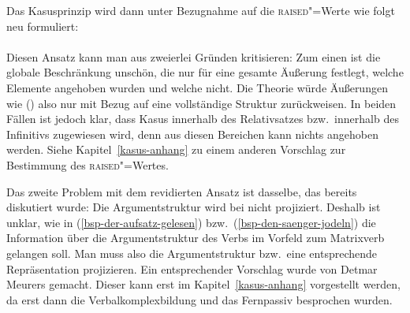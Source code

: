 Das Kasusprinzip wird dann unter Bezugnahme auf die \textsc{raised}"=Werte wie folgt neu formuliert:
\eal
\label{case-prz-zwei}
\ex {} \impl \\
    \mbox{}\hfill{}
\ex {} \impl \\
    \mbox{}\hfill{}
\zl
Diesen Ansatz kann man aus zweierlei Gründen kritisieren: Zum einen ist die globale Beschränkung
unschön, die nur für eine gesamte Äußerung festlegt, welche Elemente angehoben wurden und welche nicht.
Die Theorie würde Äußerungen wie () also nur mit Bezug auf eine vollständige Struktur zurückweisen.
\eal
{}
\zl
In beiden Fällen ist jedoch klar, dass Kasus innerhalb des Relativsatzes bzw.\
innerhalb des Infinitivs zugewiesen wird, denn aus diesen Bereichen kann nichts angehoben werden. 
Siehe Kapitel~\ref{kasus-anhang} zu einem anderen Vorschlag zur Bestimmung des \textsc{raised}"=Wertes.

Das zweite Problem mit dem revidierten Ansatz ist dasselbe, das bereits diskutiert
wurde: Die Argumentstruktur wird bei \prz nicht projiziert. Deshalb ist
unklar, wie in (\ref{bsp-der-aufsatz-gelesen}) bzw.\ (\ref{bsp-den-saenger-jodeln})
die Information über die Argumentstruktur des Verbs im Vorfeld zum
Matrixverb gelangen soll. Man muss also die Argumentstruktur bzw.\ eine entsprechende
Repräsentation projizieren. Ein entsprechender Vorschlag wurde von Detmar Meurers gemacht.
Dieser kann erst im Kapitel~\ref{kasus-anhang} vorgestellt werden, da erst dann 
die Verbalkomplexbildung und das Fernpassiv besprochen wurden.




